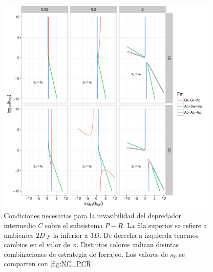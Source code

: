\begin{figure}
  \centering
  \includegraphics[width = 0.99\textwidth]{./Plots/NecCPR.pdf}
  \caption[Condiciones Necesarias $C \to P-R$]{Condiciones necesarias para la invasibilidad del depredador intermedio $C$ sobre el subsistema $P-R$. La fila superior se refiere a ambientes $2D$ y la inferior a $3D$. De derecha a izquierda tenemos cambios en el valor de $\phi$. Distintos colores indican disintas combinaciones de estrategia de forrajeo. Los valores de $\kappa_0$ se comparten con \ref{fig:NC_PCR}.}
  \label{fig:NC_CPR}
\end{figure}


